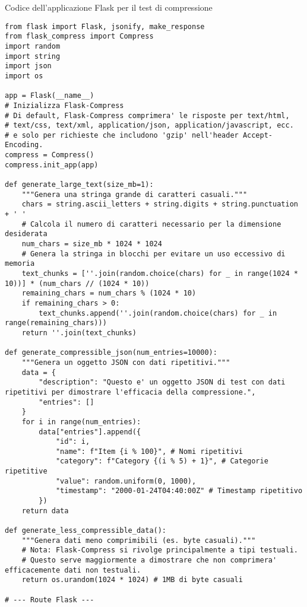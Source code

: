 \begin{longlisting}
\caption{Codice dell'applicazione Flask per il test di compressione}
\label{lst:flask_compression_app} %
\begin{verbatim}
from flask import Flask, jsonify, make_response
from flask_compress import Compress
import random
import string
import json
import os

app = Flask(__name__)
# Inizializza Flask-Compress
# Di default, Flask-Compress comprimera' le risposte per text/html,
# text/css, text/xml, application/json, application/javascript, ecc.
# e solo per richieste che includono 'gzip' nell'header Accept-Encoding.
compress = Compress()
compress.init_app(app)

def generate_large_text(size_mb=1):
    """Genera una stringa grande di caratteri casuali."""
    chars = string.ascii_letters + string.digits + string.punctuation + ' '
    # Calcola il numero di caratteri necessario per la dimensione desiderata
    num_chars = size_mb * 1024 * 1024
    # Genera la stringa in blocchi per evitare un uso eccessivo di memoria
    text_chunks = [''.join(random.choice(chars) for _ in range(1024 * 10))] * (num_chars // (1024 * 10))
    remaining_chars = num_chars % (1024 * 10)
    if remaining_chars > 0:
        text_chunks.append(''.join(random.choice(chars) for _ in range(remaining_chars)))
    return ''.join(text_chunks)

def generate_compressible_json(num_entries=10000):
    """Genera un oggetto JSON con dati ripetitivi."""
    data = {
        "description": "Questo e' un oggetto JSON di test con dati ripetitivi per dimostrare l'efficacia della compressione.",
        "entries": []
    }
    for i in range(num_entries):
        data["entries"].append({
            "id": i,
            "name": f"Item {i % 100}", # Nomi ripetitivi
            "category": f"Category {(i % 5) + 1}", # Categorie ripetitive
            "value": random.uniform(0, 1000),
            "timestamp": "2000-01-24T04:40:00Z" # Timestamp ripetitivo
        })
    return data

def generate_less_compressible_data():
    """Genera dati meno comprimibili (es. byte casuali)."""
    # Nota: Flask-Compress si rivolge principalmente a tipi testuali.
    # Questo serve maggiormente a dimostrare che non comprimera' efficacemente dati non testuali.
    return os.urandom(1024 * 1024) # 1MB di byte casuali

# --- Route Flask ---


\end{verbatim}
\end{longlisting}
